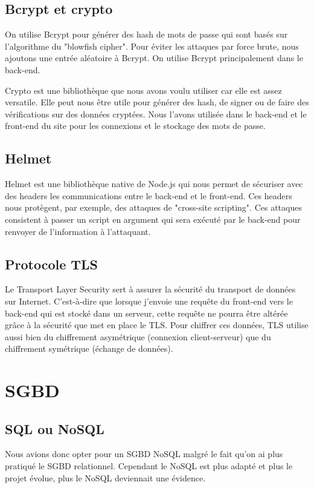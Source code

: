 \documentclass[a4paper,12pt]{report}
\begin{document}
\subsection{Bcrypt et crypto}
On utilise Bcrypt pour générer des hash de mots de passe qui sont basés sur l'algorithme du "blowfish cipher". Pour éviter les attaques par force brute, nous ajoutons une entrée aléatoire à Bcrypt. On utilise Bcrypt principalement dans le back-end.

Crypto est une bibliothèque que nous avons voulu utiliser car elle est assez versatile. Elle peut nous être utile pour générer des hash, de signer ou de faire des vérifications sur des données cryptées. Nous l'avons utilisée dans le back-end et le front-end du site pour les connexions et le stockage des mots de passe.

\newpage
\subsection{Helmet}
Helmet est une bibliothèque native de Node.js qui nous permet de sécuriser avec des headers les communications entre le back-end et le front-end. Ces headers nous protègent, par exemple, des attaques de "cross-site scripting". 
Ces attaques consistent à passer un script en argument qui sera exécuté par le back-end pour renvoyer de l'information à l'attaquant.

\subsection{Protocole TLS}
Le Transport Layer Security sert à assurer la sécurité du transport de données sur Internet. C'est-à-dire que lorsque j'envoie une requête du front-end vers le back-end qui est stocké dans un serveur, cette requête ne pourra être altérée grâce à la sécurité que met en place le TLS. 
Pour chiffrer ces données, TLS utilise aussi bien du chiffrement asymétrique (connexion client-serveur) que du chiffrement symétrique (échange de données).
	
\section{SGBD}

\subsection{SQL ou NoSQL}
Nous avions donc opter pour un SGBD NoSQL malgré le fait qu'on ai plus pratiqué le SGBD relationnel. Cependant le NoSQL est plus adapté et plus le projet évolue, plus le NoSQL deviennait une évidence.
\end{document}
